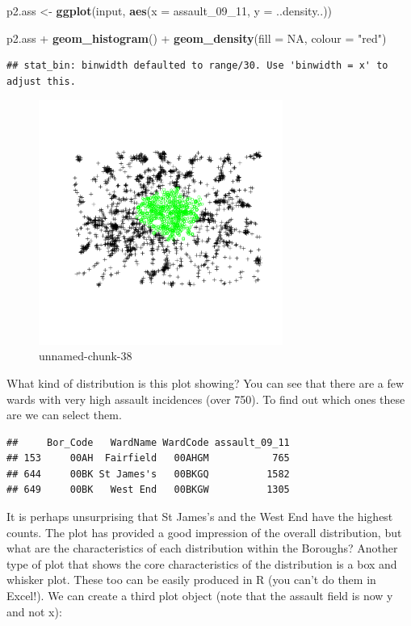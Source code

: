 \documentclass[]{article}
\newenvironment{Shaded}{}{}
\newcommand{\KeywordTok}[1]{\textcolor[rgb]{0.00,0.44,0.13}{\textbf{{#1}}}}
\newcommand{\DataTypeTok}[1]{\textcolor[rgb]{0.56,0.13,0.00}{{#1}}}
\newcommand{\DecValTok}[1]{\textcolor[rgb]{0.25,0.63,0.44}{{#1}}}
\newcommand{\StringTok}[1]{\textcolor[rgb]{0.25,0.44,0.63}{{#1}}}
\newcommand{\OtherTok}[1]{\textcolor[rgb]{0.00,0.44,0.13}{{#1}}}
\newcommand{\NormalTok}[1]{{#1}}
\begin{document}
\begin{Shaded}
\begin{Highlighting}[]
\NormalTok{p2.ass <- }\KeywordTok{ggplot}\NormalTok{(input, }\KeywordTok{aes}\NormalTok{(}\DataTypeTok{x =} \NormalTok{assault_09_11, }\DataTypeTok{y =} \NormalTok{..density..))}

\NormalTok{p2.ass + }\KeywordTok{geom_histogram}\NormalTok{() + }\KeywordTok{geom_density}\NormalTok{(}\DataTypeTok{fill =} \OtherTok{NA}\NormalTok{, }\DataTypeTok{colour =} \StringTok{"red"}\NormalTok{)}
\end{Highlighting}
\end{Shaded}
\begin{verbatim}
## stat_bin: binwidth defaulted to range/30. Use 'binwidth = x' to adjust this.
\end{verbatim}
\begin{figure}[htbp]
\centering
\includegraphics[width=8cm]{figure/unnamed-chunk-38.png}
\caption{unnamed-chunk-38}
\end{figure}

What kind of distribution is this plot showing? You can see that there
are a few wards with very high assault incidences (over 750). To find
out which ones these are we can select them.

\begin{Shaded}
\end{Shaded}
\begin{verbatim}
##     Bor_Code   WardName WardCode assault_09_11
## 153     00AH  Fairfield   00AHGM           765
## 644     00BK St James's   00BKGQ          1582
## 649     00BK   West End   00BKGW          1305
\end{verbatim}
It is perhaps unsurprising that St James's and the West End have the
highest counts. The plot has provided a good impression of the overall
distribution, but what are the characteristics of each distribution
within the Boroughs? Another type of plot that shows the core
characteristics of the distribution is a box and whisker plot. These too
can be easily produced in R (you can't do them in Excel!). We can create
a third plot object (note that the assault field is now y and not x):
\end{document}
